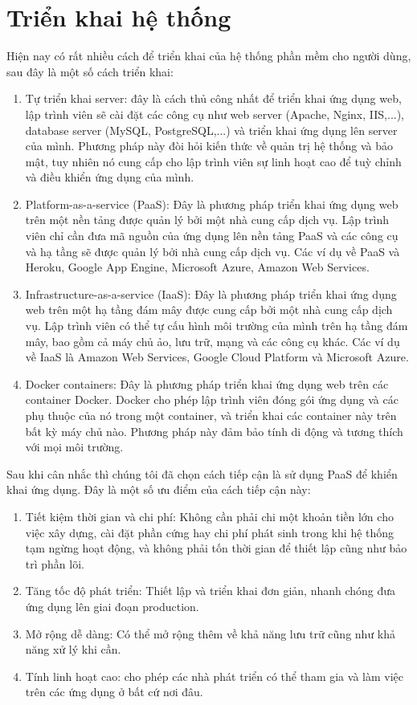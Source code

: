 \section{Triển khai hệ thống}
Hiện nay có rất nhiều cách để triển khai của hệ thống phần mềm cho người dùng, sau đây là một số cách triển khai:
\begin{enumerate}
    \item Tự triển khai server: đây là cách thủ công nhất để triển khai ứng dụng web, lập trình viên sẽ cài đặt các công cụ như web server (Apache, Nginx, IIS,...), database server (MySQL, PostgreSQL,...) và triển khai ứng dụng lên server của mình. Phương pháp này đòi hỏi kiến thức về quản trị hệ thống và bảo mật, tuy nhiên nó cung cấp cho lập trình viên sự linh hoạt cao để tuỳ chỉnh và điều khiển ứng dụng của mình.
    \item Platform-as-a-service (PaaS): Đây là phương pháp triển khai ứng dụng web trên một nền tảng được quản lý bởi một nhà cung cấp dịch vụ. Lập trình viên chỉ cần đưa mã nguồn của ứng dụng lên nền tảng PaaS và các công cụ và hạ tầng sẽ được quản lý bởi nhà cung cấp dịch vụ. Các ví dụ về PaaS và Heroku, Google App Engine, Microsoft Azure, Amazon Web Services.
    \item Infrastructure-as-a-service (IaaS): Đây là phương pháp triển khai ứng dụng web trên một hạ tầng đám mây được cung cấp bởi một nhà cung cấp dịch vụ. Lập trình viên có thể tự cấu hình môi trường của mình trên hạ tầng đám mây, bao gồm cả máy chủ ảo, lưu trữ, mạng và các công cụ khác. Các ví dụ về IaaS là Amazon Web Services, Google Cloud Platform và Microsoft Azure.
    \item Docker containers: Đây là phương pháp triển khai ứng dụng web trên các container Docker. Docker cho phép lập trình viên đóng gói ứng dụng và các phụ thuộc của nó trong một container, và triển khai các container này trên bất kỳ máy chủ nào. Phương pháp này đảm bảo tính di động và tương thích với mọi môi trường.
\end{enumerate}
Sau khi cân nhắc thì chúng tôi đã chọn cách tiếp cận là sử dụng PaaS để khiển khai ứng dụng. Đây là một số ưu điểm của cách tiếp cận này: 
\begin{enumerate}
    \item Tiết kiệm thời gian và chi phí: Không cần phải chi một khoản tiền lớn cho việc xây dựng, cài đặt phần cứng hay chi phí phát sinh trong khi hệ thống tạm ngừng hoạt động, và không phải tốn thời gian để thiết lập cũng như bảo trì phần lõi.
    \item Tăng tốc độ phát triển: Thiết lập và triển khai đơn giản, nhanh chóng đưa ứng dụng lên giai đoạn production.
    \item Mở rộng dễ dàng: Có thể mở rộng thêm về khả năng lưu trữ cũng như khả năng xử lý khi cần.
    \item Tính linh hoạt cao: cho phép các nhà phát triển có thể tham gia và làm việc trên các ứng dụng ở bất cứ nơi đâu.
\end{enumerate}
